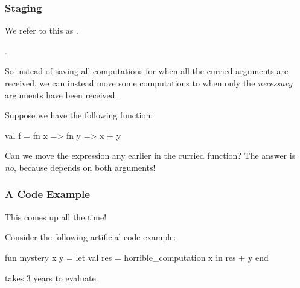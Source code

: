 \documentclass[aspectratio=169, handout]{beamer}
\begin{document}
\begin{frame}[fragile]
  \frametitle{Staging}

  We refer to this as .

  \pause
  \vspace{\fill}

  .

  \pause
  \vspace{\fill}

  So instead of saving all computations for when all the curried arguments are received,
  we can instead move some computations to when only the \textit{necessary} arguments
  have been received.

  \pause
  \vspace{\fill}

  Suppose we have the following function:
  \begin{codeblock}
    val f = fn x => fn y => x + y
  \end{codeblock}

  \pause
  \vspace{\fill}

  Can we move the expression  any earlier in the curried function? The
  answer is \textit{no}, because  depends on both arguments!
\end{frame}

\begin{frame}[fragile]
  \frametitle{A Code Example}

  This comes up all the time!

  \pause
  \vspace{\fill}

  Consider the following artificial code example:

  \begin{codeblock}
    fun mystery x y =
      let
        val res = horrible_computation x
      in
        res + y
      end
  \end{codeblock}

  \pause
  \vspace{\fill}

   takes 3 years to evaluate.
\end{frame}
\end{document}
